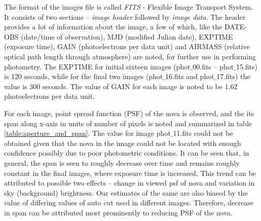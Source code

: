 \documentclass{tda}
\begin{document}
	The format of the images file is called \emph{FITS} - Flexible Image Transport System. It consists of two sections -- \emph{image header} followed by \emph{image data}. The header provides a lot of information about the image, a few of which, like the DATE-OBS (date/time of observation), MJD (modified Julian date), EXPTIME (exposure time), GAIN (photoelectrons per data unit) and AIRMASS (relative optical path length through atmosphere) are noted, for further use in performing photometry. The EXPTIME for initial sixteen images (phot\(\_\)00.fits -- phot\(\_\)15.fits) is 120 seconds, while for the final two images (phot\(\_\)16.fits and phot\(\_\)17.fits) the value is 300 seconds. The value of GAIN for each image is noted to be 1.62 photoelectrons per data unit.

	For each image, point spread function (PSF) of the nova is observed, and the its span along x-axis in units of number of pixels is noted and summarized in table \ref{table:aperture_and_span}. The value for image phot\(\_\)11.fits could not be obtained given that the nova in the image could not be located with enough confidence possibly due to poor photometric conditions. It can be seen that, in general, the span is seen to roughly decrease over time and remains roughly constant in the final images, where exposure time is increased. This trend can be attributed to possible two effects -- change in viewed psf of nova and variation in sky (background) brightness. Our estimates of the same are also biased by the value of differing values of auto cut used in different images. Therefore, decrease in span can be attributed most prominently to reducing PSF of the nova.
\end{document}
